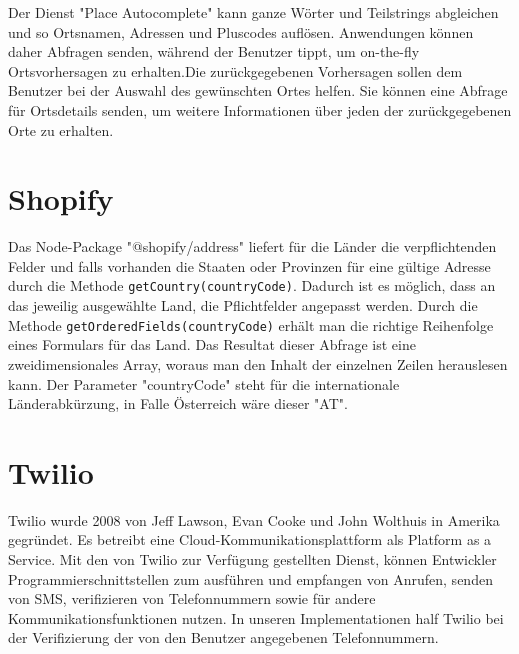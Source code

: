 Der Dienst "Place Autocomplete" kann ganze Wörter und Teilstrings abgleichen und so Ortsnamen, Adressen und Pluscodes auflösen. Anwendungen können daher Abfragen senden, während der Benutzer tippt, um on-the-fly Ortsvorhersagen zu erhalten.Die zurückgegebenen Vorhersagen sollen dem Benutzer bei der Auswahl des gewünschten Ortes helfen. Sie können eine Abfrage für Ortsdetails senden, um weitere Informationen über jeden der zurückgegebenen Orte zu erhalten.\cite{googlePlacesAPI}

\section{Shopify}
Das Node-Package "@shopify/address" liefert für die Länder die verpflichtenden Felder und falls vorhanden die Staaten oder Provinzen für eine gültige Adresse durch die Methode \texttt{getCountry(countryCode)}. Dadurch ist es möglich, dass an das jeweilig ausgewählte Land, die Pflichtfelder angepasst werden. Durch die Methode \texttt{getOrderedFields(countryCode)} erhält man die richtige Reihenfolge eines Formulars für das Land. Das Resultat dieser Abfrage ist eine zweidimensionales Array, woraus man den Inhalt der einzelnen Zeilen herauslesen kann. Der Parameter "countryCode" steht für die internationale Länderabkürzung, in Falle Österreich wäre dieser "AT". \autocite{shopifyNPM}

\section{Twilio} \label{sec:twilio}
Twilio wurde 2008 von Jeff Lawson, Evan Cooke und John Wolthuis in Amerika gegründet. Es betreibt eine Cloud-Kommunikationsplattform als Platform as a Service. Mit den von Twilio zur Verfügung gestellten Dienst, können Entwickler Programmierschnittstellen zum ausführen und empfangen von Anrufen, senden von SMS, verifizieren von Telefonnummern sowie für andere Kommunikationsfunktionen nutzen. In unseren Implementationen half Twilio bei der Verifizierung der von den Benutzer angegebenen Telefonnummern. \cite{twilioWebsite}

